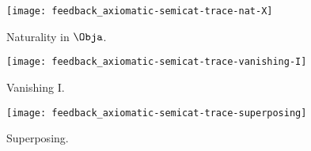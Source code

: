 
\begin{figure}[h!]
    \centering
    \texttt{[image: feedback\_axiomatic-semicat-trace-nat-X]}
    \caption{Naturality in $\Obja$.}
    \label{fig:axiomatic-semicat-trace-nat-X}
\end{figure}

\begin{figure}[h!]
    \centering
    \texttt{[image: feedback\_axiomatic-semicat-trace-vanishing-I]}
    \caption{Vanishing I.}
    \label{fig:axiomatic-semicat-trace-vanishing-I}
\end{figure}

\begin{figure}[h!]
    \centering
    \texttt{[image: feedback\_axiomatic-semicat-trace-superposing]}
    \caption{Superposing.}
    \label{fig:axiomatic-semicat-trace-superposing}
\end{figure}

